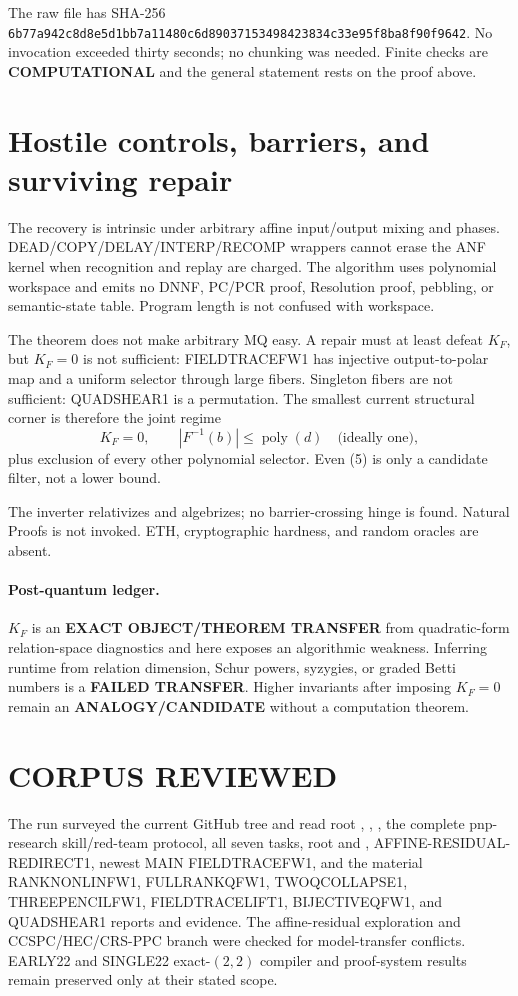 \documentclass[11pt]{article}
\newcommand{\COMP}{\textbf{COMPUTATIONAL}}
\begin{document}
The raw file
has SHA-256
\texttt{6b77a942c8d8e5d1bb7a11480c6d89037153498423834c33e95f8ba8f90f9642}.
No invocation exceeded thirty seconds; no chunking was needed.  Finite checks
are \COMP{} and the general statement rests on the proof above.

\section{Hostile controls, barriers, and surviving repair}
The recovery is intrinsic under arbitrary affine input/output mixing and
phases.  DEAD/COPY/DELAY/INTERP/RECOMP wrappers cannot erase the ANF kernel
when recognition and replay are charged.  The algorithm uses polynomial
workspace and emits no DNNF, PC/PCR proof, Resolution proof, pebbling, or
semantic-state table.  Program length is not confused with workspace.

The theorem does not make arbitrary MQ easy.  A repair must at least defeat
$K_F$, but $K_F=0$ is not sufficient: FIELDTRACEFW1 has injective
output-to-polar map and a uniform selector through large fibers.  Singleton
fibers are not sufficient: QUADSHEAR1 is a permutation.  The smallest current
structural corner is therefore the joint regime
\[
 K_F=0,\qquad |F^{-1}(b)|\le\operatorname{poly}(d)
 \quad\text{(ideally one)},                              \tag{5}
\]
plus exclusion of every other polynomial selector.  Even (5) is only a
candidate filter, not a lower bound.

The inverter relativizes and algebrizes; no barrier-crossing hinge is found.
Natural Proofs is not invoked.  ETH, cryptographic hardness, and random
oracles are absent.

\paragraph{Post-quantum ledger.}
$K_F$ is an \textbf{EXACT OBJECT/THEOREM TRANSFER} from quadratic-form
relation-space diagnostics and here exposes an algorithmic weakness.
Inferring runtime from relation dimension, Schur powers, syzygies, or graded
Betti numbers is a \textbf{FAILED TRANSFER}.  Higher invariants after imposing
$K_F=0$ remain an \textbf{ANALOGY/CANDIDATE} without a computation theorem.

\section{CORPUS REVIEWED}
The run surveyed the current GitHub tree and read root ,
, , the complete pnp-research skill/red-team
protocol, all seven tasks, root  and ,
AFFINE-RESIDUAL-REDIRECT1, newest MAIN FIELDTRACEFW1, and the material
RANKNONLINFW1, FULLRANKQFW1, TWOQCOLLAPSE1, THREEPENCILFW1,
FIELDTRACELIFT1, BIJECTIVEQFW1, and QUADSHEAR1 reports and evidence.  The
affine-residual exploration and CCSPC/HEC/CRS-PPC branch were checked for
model-transfer conflicts.  EARLY22 and SINGLE22 exact-$(2,2)$ compiler and
proof-system results remain preserved only at their stated scope.
\end{document}
